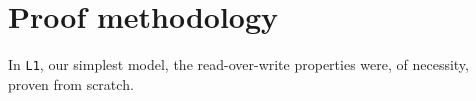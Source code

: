 \documentclass[submission,copyright,creativecommons]{eptcs}
\begin{document}






\section{Proof methodology}

In \texttt{L1}, our simplest model, the read-over-write properties
were, of necessity, proven from scratch.
\end{document}
